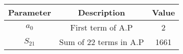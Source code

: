 \renewcommand{\arraystretch}{2}
\begin{tabular}{|c|c|c|}
\hline 
\setlength{\tabcolsep}{1pt}
\textbf{Parameter}  &\textbf{Description} &\textbf{Value} \\
\hline
$a_0$ & First term of A.P & 2 \\
\hline
$S_{21}$ & Sum of 22 terms in A.P & 1661 \\
\hline
\end{tabular}
